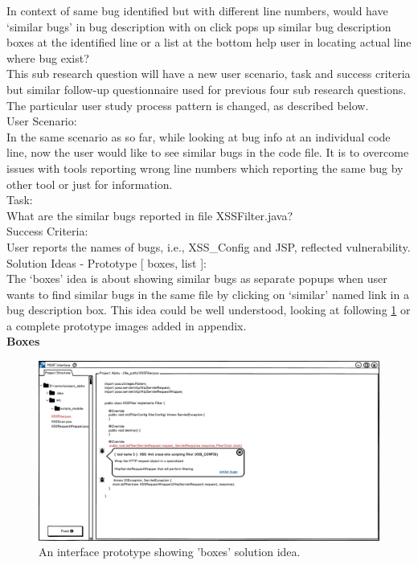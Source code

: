 In context of same bug identified but with different line numbers, would have ‘similar bugs’ in bug description with on click pops up similar bug description boxes at the identified line or a list at the bottom help user in locating actual line where bug exist? \\


This sub research question will have a new user scenario, task and success criteria but similar follow-up questionnaire used for previous four sub research questions. The particular user study process pattern is changed, as described below. \\

User Scenario: \\

In the same scenario as so far, while looking at bug info at an individual code line, now the user would like to see similar bugs in the code file. It is to overcome issues with tools reporting wrong line numbers which reporting the same bug by other tool or just for information. \\

Task: \\

What are the similar bugs reported in file XSSFilter.java? \\

Success Criteria: \\

User reports the names of bugs, i.e., XSS\_Config and JSP, reflected vulnerability. \\


Solution Ideas - Prototype [ boxes, list ]: \\

The ‘boxes’ idea is about showing similar bugs as separate popups when user wants to find similar bugs in the same file by clicking on ‘similar’ named link in a bug description box. This idea could be well understood, looking at following \ref{fig:S31_similar_boxes} or a complete prototype images added in appendix. \\

\textbf{Boxes}
\begin{figure}[hbt!]
	\centering
	\includegraphics[width=\linewidth]{figures/solution_ideas_snaps/S31_similar_boxes}
	\caption{An interface prototype showing 'boxes' solution idea.}
	\label{fig:S31_similar_boxes}
\end{figure} 

